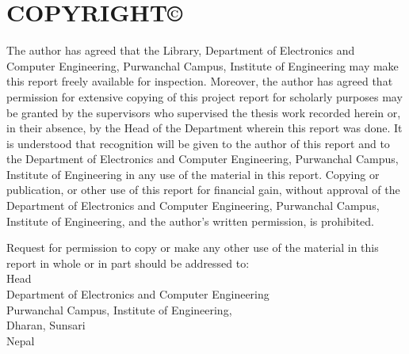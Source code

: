 \chapter*{COPYRIGHT©}



The author has agreed that the Library, Department of Electronics and Computer Engineering, Purwanchal Campus, Institute of Engineering may make this report freely available for inspection. Moreover, the author has agreed that permission for extensive copying of this project report for scholarly purposes may be granted by the supervisors who supervised the thesis work recorded herein or, in their absence, by the Head of the Department wherein this report was done. It is understood that recognition will be given to the author of this report and to the Department of Electronics and Computer Engineering, Purwanchal Campus, Institute of Engineering in any use of the material in this report. Copying or publication, or other use of this report for financial gain, without approval of the Department of Electronics and Computer Engineering, Purwanchal Campus, Institute of Engineering, and the author's written permission, is prohibited.

Request for permission to copy or make any other use of the material in this report in whole or in part should be addressed to:\\

Head\\
Department of Electronics and Computer Engineering\\
Purwanchal Campus, Institute of Engineering,\\
Dharan, Sunsari\\
Nepal




